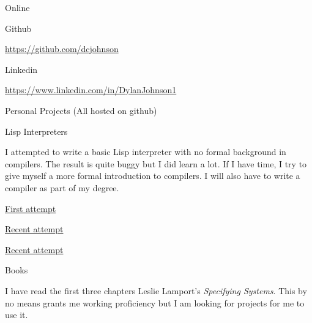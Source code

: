 \documentclass{resume} %
\begin{document}
\begin{rSection}{Online}

\begin{rSubsection}{Github}{}{}{}
	\item {\href{https://github.com/dcjohnson}{https://github.com/dcjohnson}}
\end{rSubsection}

\begin{rSubsection}{Linkedin}{}{}{}
	\item {\href{https://www.linkedin.com/in/DylanJohnson1}{https://www.linkedin.com/in/DylanJohnson1}}
\end{rSubsection}

\end{rSection}

\begin{rSection}{Personal Projects (All hosted on github)}

\begin{rSubsection}{Lisp Interpreters}{}{}{}
	\item I attempted to write a basic Lisp interpreter with no formal background in compilers. The result is quite buggy but I did learn a lot. If I have time, I try to give myself a more formal introduction to compilers. I will also have to write a compiler as part of my degree.
	\item {\href{https://github.com/dcjohnson/hackit}{First attempt}}
	\item {\href{https://github.com/dcjohnson/hackit-v2}{Recent attempt}}
	\item {\href{https://github.com/dcjohnson/libhackit-v2}{Recent attempt}}
\end{rSubsection}

\begin{rSubsection}{Books}{}{}{}
	\item I have read the first three chapters Leslie Lamport's \textit{Specifying Systems}. This by no means grants me working proficiency but I am looking for projects for me to use it.
\end{rSubsection}

\end{rSection}

\end{document}
